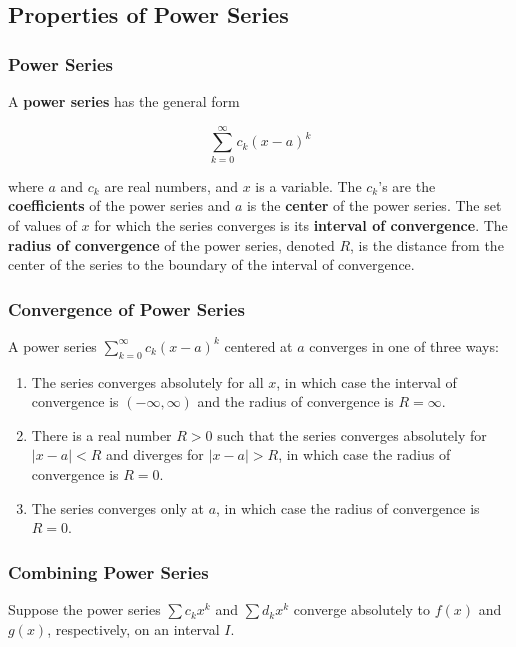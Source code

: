 \subsection{Properties of Power Series}

\subsubsection{Power Series}
A \textbf{power series} has the general form

\begin{equation}
    \sum _{k = 0} ^{\infty} c_k(x - a)^k
\end{equation}

where $a$ and $c_k$ are real numbers, and $x$ is a variable. The $c_k$’s are the \textbf{coefficients} of the power series and $a$ is the \textbf{center} of the power series. The set of values of $x$ for which the series converges is its \textbf{interval of convergence}. The \textbf{radius of convergence} of the power series, denoted $R$, is the distance from the center of the series to the boundary of the interval of convergence.

\subsubsection{Convergence of Power Series}
A power series $\sum _{k = 0} ^{\infty} c_k (x - a)^k$ centered at $a$ converges in one of three ways:

\begin{enumerate}
    \item The series converges absolutely for all $x$, in which case the interval of convergence is $(-\infty, \infty)$ and the radius of convergence is $R = \infty$.
    \item There is a real number $R > 0$ such that the series converges absolutely for $|x - a| < R$ and diverges for $|x - a| > R$, in which case the radius of convergence is $R = 0$.
    \item The series converges only at $a$, in which case the radius of convergence is $R = 0$.
\end{enumerate}

\subsubsection{Combining Power Series}
Suppose the power series $\sum c_k x^k$ and $\sum d_k x^k$ converge absolutely to $f(x)$ and $g(x)$, respectively, on an interval $I$.


